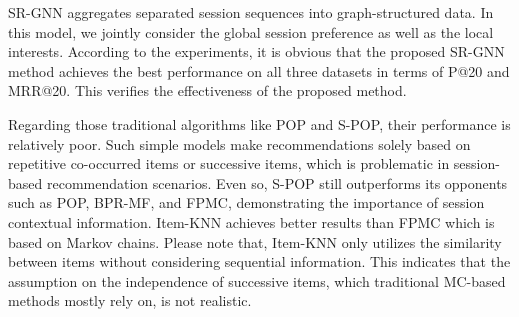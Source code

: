 \documentclass[letterpaper]{article} \usepackage{cite}
\begin{document}
\begin{table}
	\centering
	\caption{The performance of SR-GNN with other baseline methods over three datasets}
	\label{tab:result-baseline-algorithms}
\end{table}

SR-GNN aggregates separated session sequences into graph-structured data. In this model, we jointly consider the global session preference as well as the local interests. According to the experiments, it is obvious that the proposed SR-GNN method achieves the best performance on all three datasets in terms of P@20 and MRR@20. This verifies the effectiveness of the proposed method.

Regarding those traditional algorithms like POP and S-POP, their performance is relatively poor. Such simple models make recommendations solely based on repetitive co-occurred items or successive items, which is problematic in session-based recommendation scenarios. Even so, S-POP still outperforms its opponents such as POP, BPR-MF, and FPMC, demonstrating the importance of session contextual information. Item-KNN achieves better results than FPMC which is based on Markov chains. Please note that, Item-KNN only utilizes the similarity between items without considering sequential information. This indicates that the assumption on the independence of successive items, which traditional MC-based methods mostly rely on, is not realistic.
\end{document}
